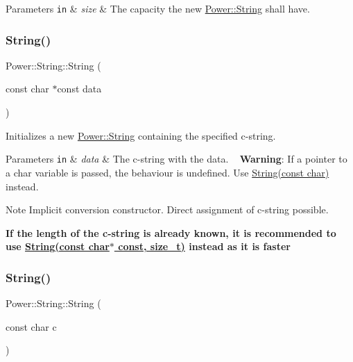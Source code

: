 \begin{DoxyParams}[1]{Parameters}
\mbox{\tt in}  & {\em size} & The capacity the new \hyperlink{class_power_1_1_string}{Power\+::\+String} shall have. \\
\hline
\end{DoxyParams}
\mbox{\label{class_power_1_1_string_aec63a74130e5abc89a1556115942a5e1}} 
\subsubsection{\texorpdfstring{String()}{String()}\hspace{0.1cm}{\footnotesize\ttfamily [3/7]}}
{\footnotesize\ttfamily Power\+::\+String\+::\+String (\begin{DoxyParamCaption}\item[{const char $\ast$const}]{data }\end{DoxyParamCaption})}



Initializes a new \hyperlink{class_power_1_1_string}{Power\+::\+String} containing the specified c-\/string. 


\begin{DoxyParams}[1]{Parameters}
\mbox{\tt in}  & {\em data} & The c-\/string with the data. ~\newline
 {\bfseries Warning}\+: If a pointer to a char variable is passed, the behaviour is undefined. Use \hyperlink{class_power_1_1_string_ad14954dc3dfbdee2196a5298fe176632}{String(const char)} instead. \\
\hline
\end{DoxyParams}
\begin{DoxyNote}{Note}
Implicit conversion constructor. Direct assignment of c-\/string possible. 

{\bfseries If the length of the c-\/string is already known, it is recommended to use \hyperlink{class_power_1_1_string_a01efecde6ea0a7f3f37750a4a1b15dcd}{String(const char$\ast$ const, size\+\_\+t)} instead as it is faster} 
\end{DoxyNote}
\mbox{\label{class_power_1_1_string_ad14954dc3dfbdee2196a5298fe176632}} 
\subsubsection{\texorpdfstring{String()}{String()}\hspace{0.1cm}{\footnotesize\ttfamily [4/7]}}
{\footnotesize\ttfamily Power\+::\+String\+::\+String (\begin{DoxyParamCaption}\item[{const char}]{c }\end{DoxyParamCaption})}



